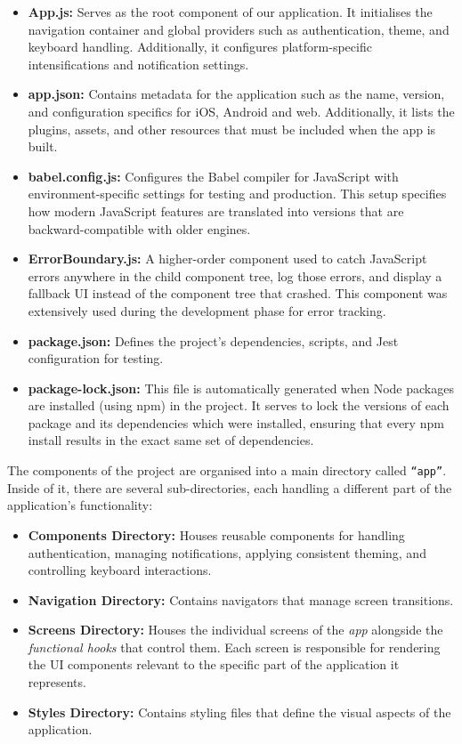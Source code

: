 \begin{itemize}
    \item \textbf{App.js:} Serves as the root component of our application. It initialises the navigation container and global providers such as authentication, theme, and keyboard handling. Additionally, it configures platform-specific intensifications and notification settings.
    \item \textbf{app.json:} Contains metadata for the application such as the name, version, and configuration specifics for iOS, Android and web. Additionally, it lists the plugins, assets, and other resources that must be included when the app is built.
    \item \textbf{babel.config.js:} Configures the Babel compiler for JavaScript with environment-specific settings for testing and production. This setup specifies how modern JavaScript features are translated into versions that are backward-compatible with older engines.
    \item \textbf{ErrorBoundary.js:} A higher-order component used to catch JavaScript errors anywhere in the child component tree, log those errors, and display a fallback UI instead of the component tree that crashed. This component was extensively used during the development phase for error tracking.
    \item \textbf{package.json:} Defines the project’s dependencies, scripts, and Jest configuration for testing.
    \item \textbf{package-lock.json:} This file is automatically generated when Node packages are installed (using npm) in the project. It serves to lock the versions of each package and its dependencies which were installed, ensuring that every npm install results in the exact same set of dependencies.
\end{itemize}

The components of the project are organised into a main directory called \texttt{``app''}. Inside of it, there are several sub-directories, each handling a different part of the application's functionality:

\begin{itemize}
    \item \textbf{Components Directory:} Houses reusable components for handling authentication, managing notifications, applying consistent theming, and controlling keyboard interactions.
    \item \textbf{Navigation Directory:} Contains navigators that manage screen transitions.
    \item \textbf{Screens Directory:} Houses the individual screens of the \textit{app} alongside the \textit{functional hooks} that control them. Each screen is responsible for rendering the UI components relevant to the specific part of the application it represents.
    \item \textbf{Styles Directory:} Contains styling files that define the visual aspects of the application.
\end{itemize}

